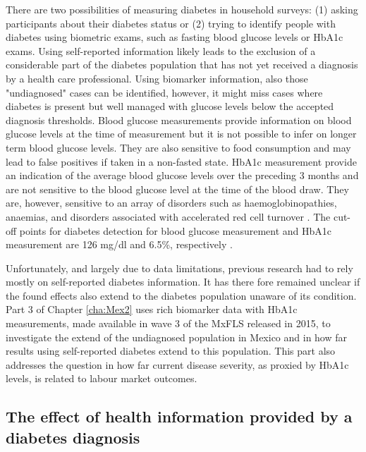 There are two possibilities of measuring diabetes in household surveys: (1) asking participants about their diabetes status or (2) trying to identify people with diabetes using biometric exams, such as fasting blood glucose levels or \ac{HbA1c} exams. Using self-reported information likely leads to the exclusion of a considerable part of the diabetes population that has not yet received a diagnosis by a health care professional. Using biomarker information, also those "undiagnosed" cases can be identified, however, it might miss cases where diabetes is present but well managed with glucose levels below the accepted diagnosis thresholds. Blood glucose measurements provide information on blood glucose levels at the time of measurement but it is not possible to infer on longer term blood glucose levels. They are also sensitive to food consumption and may lead to false positives if taken in a non-fasted state. \ac{HbA1c} measurement provide an indication of the average blood glucose levels over the preceding 3 months and are not sensitive to the blood glucose level at the time of the blood draw. They are, however, sensitive to an array of disorders such as haemoglobinopathies, anaemias, and disorders associated with accelerated red cell turnover \parencite{WorldHealthOrganization2011}. The cut-off points for diabetes detection for blood glucose measurement and \ac{HbA1c} measurement are 126 mg/dl and 6.5\%, respectively \parencite{WorldHealthOrganization2006,WorldHealthOrganization2011}.

Unfortunately, and largely due to data limitations, previous research had to rely mostly on self-reported diabetes information. It has there fore remained unclear if the found effects also extend to the diabetes population unaware of its condition. Part 3 of Chapter \ref{cha:Mex2} uses rich biomarker data with \ac{HbA1c} measurements, made available in wave 3 of the \ac{MxFLS} released in 2015, to investigate the extend of the undiagnosed population in Mexico and in how far results using self-reported diabetes extend to this population. This part also addresses the question in how far current disease severity, as proxied by \ac{HbA1c} levels, is related to labour market outcomes.

\subsection{The effect of health information provided by a diabetes diagnosis}

